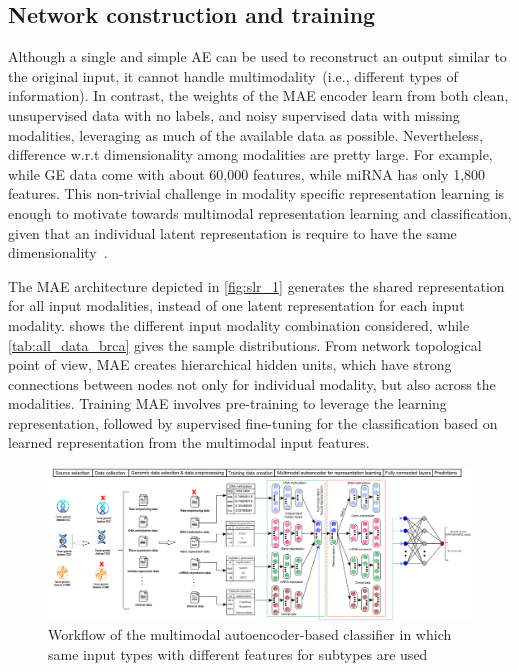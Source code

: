 \subsection{Network construction and training}
Although a single and simple AE can be used to reconstruct an output similar to the original input, it cannot handle multimodality~(i.e., different types of information). In contrast, the weights of the MAE encoder learn from both clean, unsupervised data with no labels, and noisy supervised data with missing modalities, leveraging as much of the available data as possible.
Nevertheless, difference w.r.t dimensionality among modalities are pretty large. For example, while GE data come with about 60,000 features, while miRNA has only 1,800 features. This non-trivial challenge in modality specific representation learning is enough to motivate towards multimodal representation learning and classification, given that an individual latent representation is require to have the same dimensionality~\cite{mmdcae}.

\hspace*{3.5mm} The MAE architecture depicted in \cref{fig:slr_1} generates the shared representation for all input modalities, instead of one latent representation for each input modality.  shows the different input modality combination considered, while \cref{tab:all_data_brca} gives the sample distributions. From network topological point of view, MAE creates hierarchical hidden units, which have strong connections between nodes not only for individual modality, but also across the modalities.  
Training MAE involves pre-training to leverage the learning representation, followed by supervised fine-tuning for the classification based on learned  representation from the multimodal input features. 

\begin{figure}
	\centering
	\includegraphics[scale=0.75]{images/mae_v2.png}
	\caption[Workflow of the multimodal autoencoder classifier]{Workflow of the multimodal autoencoder-based classifier in which same input types with different features for subtypes %
	are used~\cite{karimACCESS2019}}
	\label{fig:wf_mae}
\end{figure}

